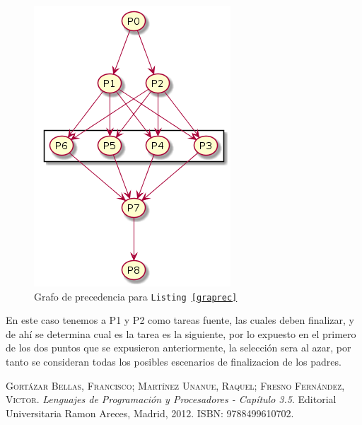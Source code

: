 \documentclass{article}
\begin{document}
\begin{figure}[H]
  \centering
  \includegraphics[width=.4\linewidth]{grafo_precedencia.png}
  \caption{Grafo de precedencia para \texttt{Listing \ref{graprec}}}
  \label{fig:graprec}
\end{figure}

En este caso tenemos a P1 y P2 como tareas fuente, las cuales deben finalizar, y de ah\'i se determina cual es la tarea es la siguiente, por lo expuesto en el primero de los dos puntos que se expusieron anteriormente, la selecci\'on sera al azar, por tanto se consideran todas los posibles escenarios de finalizacion de los padres.

\newpage
\begin{thebibliography}{99}
	\textsc{Gort\'azar Bellas, Francisco; Mart\'inez Unanue, Raquel; Fresno Fern\'andez, Victor}. \textit{Lenguajes de Programaci\'on y Procesadores - Cap\'itulo 3.5}. Editorial Universitaria Ramon Areces, Madrid, 2012. \textsc{ISBN: 9788499610702}.
\end{thebibliography}
\end{document}
